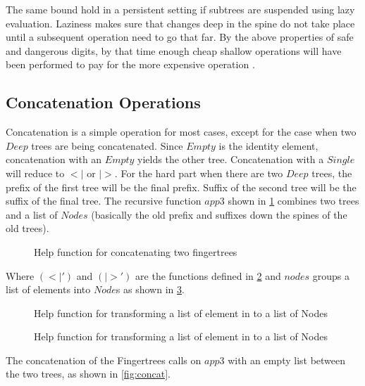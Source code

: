 The same bound hold in a persistent setting if subtrees are suspended using lazy
evaluation. Laziness makes sure that changes deep in the spine do not take place
until a subsequent operation need to go that far. By the above properties
of safe and dangerous digits, by that time enough cheap shallow operations
will have been performed to pay for the more expensive operation
\cite{fingertree}.

\subsection{Concatenation Operations}
Concatenation is a simple operation for most cases, except for the case when two
$Deep$ trees are being concatenated. Since $Empty$ is the identity element,
concatenation with an $Empty$ yields the other tree. Concatenation with a
$Single$ will reduce to $<|$ or $|>$. For the hard part when there are two
$Deep$ trees, the prefix of the first tree will be the final prefix. Suffix of
the second tree will be the suffix of the final tree. The recursive function
$app3$ shown in \cref{fig:concatHelp} combines two trees and a list of $Nodes$
(basically the old prefix and suffixes down the spines of the old trees).

\begin{figure}[h!]

\caption{Help function for concatenating two fingertrees \label{fig:concatHelp}}
\end{figure}

Where $(<|')$ and $(|>')$ are the functions defined in \cref{fig:reduceAppend}
and $nodes$ groups a list of elements into $Node$s as shown in
\cref{fig:nodesHelp}. 

\begin{figure}[h!]

\caption{Help function for transforming a list of element in to a list of Nodes \label{fig:reduceAppend}}
\end{figure}


\begin{figure}[h!]

\caption{Help function for transforming a list of element in to a list of Nodes \label{fig:nodesHelp}}
\end{figure}

The concatenation of the Fingertrees calls on $app3$ with an empty list
between the two trees, as shown in \cref{fig:concat}.

